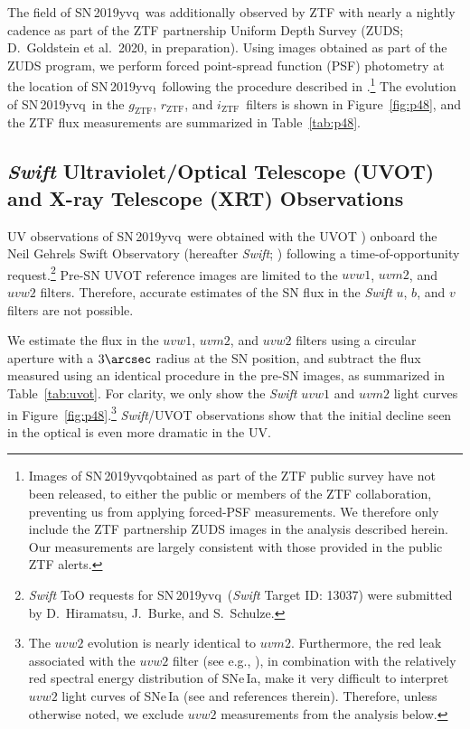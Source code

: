 \documentclass[twocolumn]{aastex63}
\newcommand{\rztf}{$r_\mathrm{ZTF}$}
\newcommand{\gztf}{$g_\mathrm{ZTF}$}
\newcommand{\iztf}{$i_\mathrm{ZTF}$}
\newcommand{\sn}{SN\,2019yvq}
\begin{document}
The field of \sn\ was additionally observed by ZTF with nearly a nightly
cadence as part of the ZTF partnership Uniform Depth Survey (ZUDS;
D.~Goldstein et al.~2020, in preparation). Using images obtained as part of
the ZUDS program, we perform forced point-spread function (PSF) photometry at
the location of \sn\ following the procedure described in
\citet{Yao19}.\footnote{Images of \sn obtained as part of the ZTF public
survey have not been released, to either the public or members of the ZTF
collaboration, preventing us from applying forced-PSF measurements. We
therefore only include the ZTF partnership ZUDS images in the analysis
described herein. Our measurements are largely consistent with those provided
in the public ZTF alerts.} The evolution of \sn\ in the \gztf, \rztf, and
\iztf\ filters is shown in Figure~\ref{fig:p48}, and the ZTF flux measurements
are summarized in Table~\ref{tab:p48}.

\subsection{\textit{Swift} Ultraviolet/Optical Telescope (UVOT) and X-ray Telescope (XRT) Observations}\label{sec:swift}



UV observations of \sn\ were obtained with the UVOT \citep{Roming05}) onboard
the Neil Gehrels Swift Observatory (hereafter \textit{Swift};
\citealt{Gehrels04}) following a time-of-opportunity
request.\footnote{\textit{Swift} ToO requests for \sn\ (\textit{Swift} Target
ID: 13037) were submitted by D.~Hiramatsu, J.~Burke, and S.~Schulze.} Pre-SN
UVOT reference images are limited to the $uvw1$, $uvm2$, and $uvw2$ filters.
Therefore, accurate estimates of the SN flux in the \textit{Swift} $u$, $b$,
and $v$ filters are not possible.

We estimate the flux in the $uvw1$, $uvm2$, and $uvw2$ filters using a
circular aperture with a $3\arcsec$ radius at the SN position, and subtract
the flux measured using an identical procedure in the pre-SN images, as
summarized in Table~\ref{tab:uvot}. For clarity, we only show the
\textit{Swift} $uvw1$ and $uvm2$ light curves in
Figure~\ref{fig:p48}.\footnote{The $uvw2$ evolution is nearly identical to
$uvm2$. Furthermore, the red leak associated with the $uvw2$ filter (see e.g.,
\citealt{Breeveld11}), in combination with the relatively red spectral energy
distribution of SNe\,Ia, make it very difficult to interpret $uvw2$ light
curves of SNe\,Ia (see \citealt{Brown17} and references therein). Therefore,
unless otherwise noted, we exclude $uvw2$ measurements from the analysis
below.} \textit{Swift}/UVOT observations show that the initial decline seen in
the optical is even more dramatic in the UV.
\end{document}
